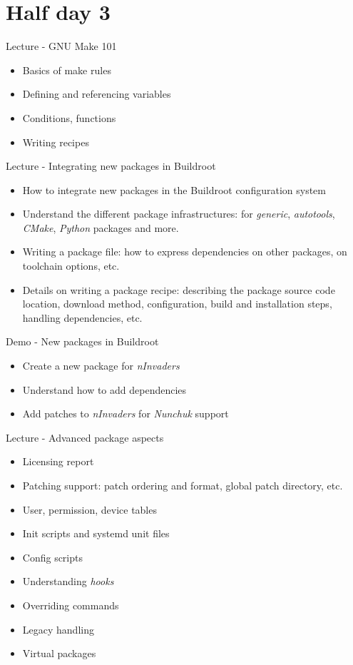 \documentclass[a4paper,12pt,obeyspaces,spaces,hyphens]{article}
\begin{document}
\section{Half day 3}

\feagendaonecolumn
{Lecture - GNU Make 101}
{
  \begin{itemize}
  \item Basics of make rules
  \item Defining and referencing variables
  \item Conditions, functions
  \item Writing recipes
  \end{itemize}
}

\feagendatwocolumn
{Lecture - Integrating new packages in Buildroot}
{
  \begin{itemize}
  \item How to integrate new packages in the Buildroot configuration
    system
  \item Understand the different package infrastructures: for {\em
      generic}, {\em autotools}, {\em CMake}, {\em Python} packages
    and more.
  \item Writing a package  file: how to express
    dependencies on other packages, on toolchain options, etc.
  \item Details on writing a package recipe: describing the package
    source code location, download method, configuration, build and
    installation steps, handling dependencies, etc.
  \end{itemize}
}
{Demo - New packages in Buildroot}
{
  \begin{itemize}
  \item Create a new package for {\em nInvaders}
  \item Understand how to add dependencies
  \item Add patches to {\em nInvaders} for {\em Nunchuk} support
  \end{itemize}
}

\feagendaonecolumn
{Lecture - Advanced package aspects}
{
  \begin{itemize}
  \item Licensing report
  \item Patching support: patch ordering and format, global patch directory, etc.
  \item User, permission, device tables
  \item Init scripts and systemd unit files
  \item Config scripts
  \item Understanding {\em hooks}
  \item Overriding commands
  \item Legacy handling
  \item Virtual packages
  \end{itemize}
}
\end{document}
